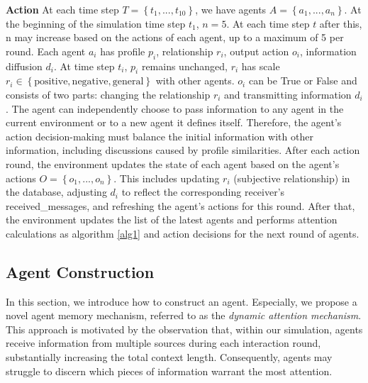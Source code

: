 
\noindent \textbf{Action} \quad At each time step $ T = \left \{ t_1,...,t_{10} \right \} $, we have agents $ A = \left \{ a_1,...,a_n \right \} $. At the beginning of the simulation time step $t_1$, $n=5$. At each time step $t$ after this, n may increase based on the actions of each agent, up to a maximum of 5 per round.
Each agent $a_i$ has profile $p_i$, relationship $r_i$, output action $o_i$, information diffusion $d_i$.
At time step $t_i$, $p_i$ remains unchanged, $r_i$ has scale $r_i \in \left \{ \text{positive}, \text{negative}, \text{general} \right \}$ with other agents.
$o_i$ can be True or False and consists of two parts: changing the relationship $r_i$ and transmitting information $d_i$.
The agent can independently choose to pass information to any agent in the current environment or to a new agent it defines itself.
Therefore, the agent's action decision-making must balance the initial information with other information, including discussions caused by profile similarities.
After each action round, the environment updates the state of each agent based on the agent's actions $ O = \left \{ o_1,..., o_n \right \} $. This includes updating $r_i$ (subjective relationship) in the database, adjusting $d_i$ to reflect the corresponding receiver's received\_messages, and refreshing the agent's actions for this round.
After that, the environment updates the list of the latest agents and performs attention calculations as algorithm \ref{alg1} and action decisions for the next round of agents.


\subsection{Agent Construction}
In this section, we introduce how to construct an agent. Especially, we propose a novel agent memory mechanism, referred to as the \textit{dynamic attention mechanism}. This approach is motivated by the observation that, within our simulation, agents receive information from multiple sources during each interaction round, substantially increasing the total context length. Consequently, agents may struggle to discern which pieces of information warrant the most attention.

